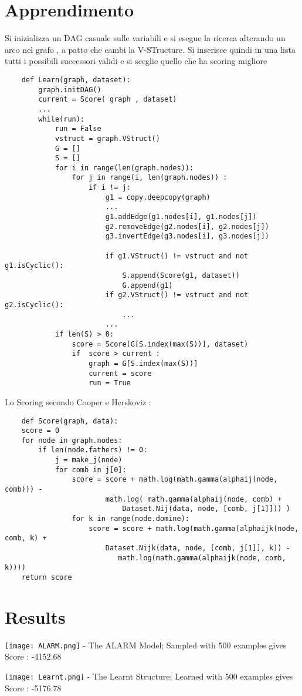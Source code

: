 \documentclass[12pt]{article}
\begin{document}
\section { Apprendimento }
    Si inizializza un DAG casuale sulle variabili e si esegue la ricerca alterando un arco nel grafo , a patto che cambi la V-STructure.
    Si inserisce quindi in una lista tutti i possibili successori validi e si sceglie quello che ha scoring migliore

\begin{verbatim}
    def Learn(graph, dataset):
        graph.initDAG()
        current = Score( graph , dataset)
        ...
        while(run):
            run = False
            vstruct = graph.VStruct()
            G = []
            S = []
            for i in range(len(graph.nodes)):
                for j in range(i, len(graph.nodes)) :
                    if i != j:
                        g1 = copy.deepcopy(graph)
                        ...
                        g1.addEdge(g1.nodes[i], g1.nodes[j])
                        g2.removeEdge(g2.nodes[i], g2.nodes[j])
                        g3.invertEdge(g3.nodes[i], g3.nodes[j])

                        if g1.VStruct() != vstruct and not g1.isCyclic():
                            S.append(Score(g1, dataset))
                            G.append(g1)
                        if g2.VStruct() != vstruct and not g2.isCyclic():
                            ...
                        ...
            if len(S) > 0:
                score = Score(G[S.index(max(S))], dataset)
                if  score > current :
                    graph = G[S.index(max(S))]
                    current = score
                    run = True
\end{verbatim}

Lo Scoring secondo Cooper e Herskoviz :
\begin{verbatim}
    def Score(graph, data):
    score = 0
    for node in graph.nodes:
        if len(node.fathers) != 0:
            j = make_j(node)
            for comb in j[0]:
                score = score + math.log(math.gamma(alphaij(node, comb))) - 
                        math.log( math.gamma(alphaij(node, comb) + 
                            Dataset.Nij(data, node, [comb, j[1]])) )
                for k in range(node.domine):
                    score = score + math.log(math.gamma(alphaijk(node, comb, k) +
                        Dataset.Nijk(data, node, [comb, j[1]], k)) - 
                           math.log(math.gamma(alphaijk(node, comb, k))))
    return score   
\end{verbatim}

\section{Results}
\texttt{[image: ALARM.png]}
- The ALARM Model; Sampled with 500 examples gives Score : -4152.68

\texttt{[image: Learnt.png]}
- The Learnt Structure; Learned with 500 examples gives Score : -5176.78
\end{document}
